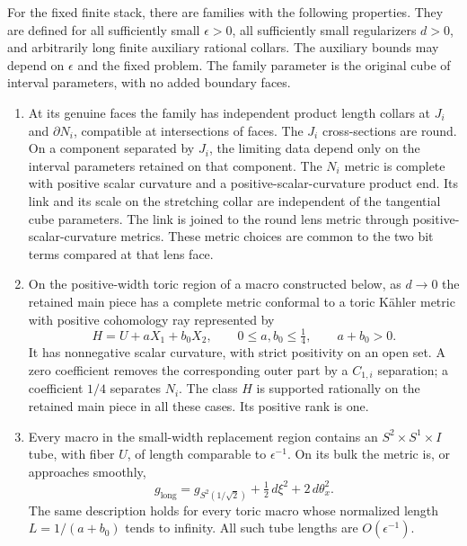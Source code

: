 \begin{theorem}
\label{thm:geometry:family}
For the fixed finite stack, there are families with the following
properties.  They are defined for all sufficiently small $\epsilon>0$,
all sufficiently small regularizers $d>0$, and arbitrarily long finite
auxiliary rational collars.  The auxiliary bounds may depend on
$\epsilon$ and the fixed problem.  The family parameter is the original
cube of interval parameters, with no added boundary faces.
\begin{enumerate}[label=\textup{(\roman*)}]
\item At its genuine faces the family has independent product length
collars at $J_i$ and $\partial N_i$, compatible at intersections of
faces.  The $J_i$ cross-sections are round.  On a component separated by
$J_i$, the limiting data depend only on the interval parameters retained
on that component.  The $N_i$ metric is complete with positive scalar
curvature and a positive-scalar-curvature product end.  Its link and its
scale on the stretching collar are independent of the tangential cube
parameters.  The link is joined to the round lens metric through
positive-scalar-curvature metrics.  These metric choices are common to
the two bit terms compared at that lens face.
\item On the positive-width toric region of a macro constructed below,
as $d\to0$ the retained main piece has a complete
metric conformal to a toric K\"ahler metric with positive cohomology ray represented by
\begin{equation}
 H=U+aX_1+b_0X_2,\qquad
 0\le a,b_0\le\tfrac14,\qquad a+b_0>0.
 \label{eq:geometry:period}
\end{equation}
It has nonnegative scalar curvature, with strict positivity on an open
set.  A zero coefficient removes the corresponding outer part by a
$C_{1,i}$ separation; a coefficient $1/4$ separates $N_i$.  The class
$H$ is supported rationally on the retained main piece in all these
cases.  Its positive rank is one.
\item Every macro in the small-width replacement region contains an
$S^2\times S^1\times I$ tube, with fiber $U$, of length comparable to
$\epsilon^{-1}$.  On its bulk the metric is, or approaches smoothly,
\begin{equation}
 g_{\mathrm{long}}
 =g_{S^2(1/\sqrt2)}+\tfrac12\,d\xi^2+2\,d\theta_x^2.
 \label{eq:geometry:long-model}
\end{equation}
The same description holds for every toric macro whose normalized
length $L=1/(a+b_0)$ tends to infinity.  All such tube lengths are $O(\epsilon^{-1})$.

\end{enumerate}
\end{theorem}
